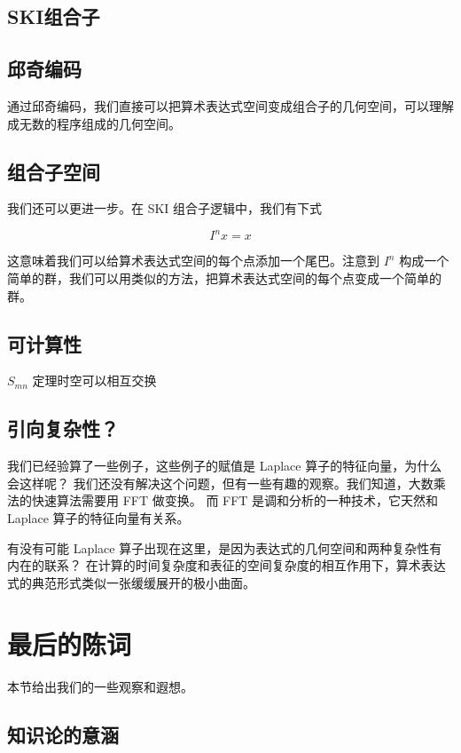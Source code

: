 \documentclass[a4paper,12pt]{article}
\numberwithin{definition}{section}
\numberwithin{lemma}{section}
\numberwithin{proposition}{section}
\numberwithin{theorem}{section}
\numberwithin{grammar}{section}
\numberwithin{program}{section}
\numberwithin{convention}{section}
\numberwithin{corollary}{section}
\begin{document}
\subsection{SKI组合子}

\subsection{邱奇编码}

通过邱奇编码，我们直接可以把算术表达式空间变成组合子的几何空间，可以理解成无数的程序组成的几何空间。

\subsection{组合子空间}

我们还可以更进一步。在 SKI 组合子逻辑中，我们有下式

$$
I^n x = x
$$

这意味着我们可以给算术表达式空间的每个点添加一个尾巴。注意到 $I^n$ 构成一个简单的群，我们可以用类似的方法，把算术表达式空间的每个点变成一个简单的群。

\subsection{可计算性}

$S_{mn}$ 定理时空可以相互交换

\subsection{引向复杂性？}

我们已经验算了一些例子，这些例子的赋值是 Laplace 算子的特征向量，为什么会这样呢？
我们还没有解决这个问题，但有一些有趣的观察。我们知道，大数乘法的快速算法需要用 FFT 做变换。
而 FFT 是调和分析的一种技术，它天然和 Laplace 算子的特征向量有关系。

有没有可能 Laplace 算子出现在这里，是因为表达式的几何空间和两种复杂性有内在的联系？
在计算的时间复杂度和表征的空间复杂度的相互作用下，算术表达式的典范形式类似一张缓缓展开的极小曲面。

\newpage

\section{最后的陈词}

本节给出我们的一些观察和遐想。

\subsection{知识论的意涵}
\end{document}

